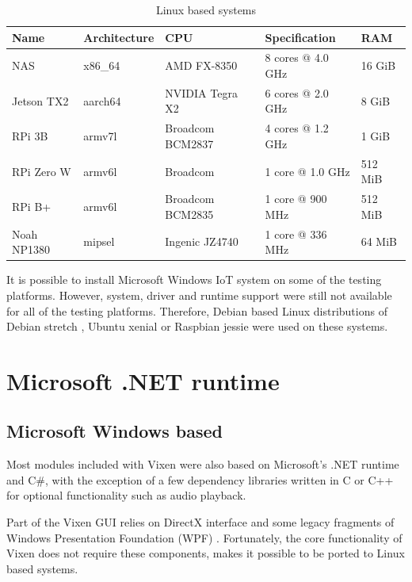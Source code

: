 \begin{table}[t]
  \centering
  \begin{tabular}{l|l|l|l|l}
    \hline
    \textbf{Name} & \textbf{Architecture} & \textbf{CPU} & \textbf{Specification} & \textbf{RAM} \\
    \hline
    NAS         & x86\_64 & AMD FX-8350       & 8 cores @ 4.0 GHz  & 16 GiB   \\ \hline
    Jetson TX2  & aarch64 & NVIDIA Tegra X2   & 6 cores @ 2.0 GHz  & 8 GiB    \\ \hline
    RPi 3B      & armv7l  & Broadcom BCM2837  & 4 cores @ 1.2 GHz  & 1 GiB    \\ \hline
    RPi Zero W  & armv6l  & Broadcom          & 1 core @ 1.0 GHz   & 512 MiB  \\ \hline
    RPi B+      & armv6l  & Broadcom BCM2835  & 1 core @ 900 MHz   & 512 MiB  \\ \hline
    Noah NP1380 & mipsel  & Ingenic JZ4740    & 1 core @ 336 MHz   & 64 MiB   \\ \hline
  \end{tabular}
  \caption{\footnotesize Linux based systems}
  \label{tbl:linux}
\end{table}

It is possible to install Microsoft Windows IoT system on some of the testing platforms. However, system, driver and runtime support were still not available for all of the testing platforms. Therefore, Debian \cite{debian} based Linux distributions of Debian stretch \cite{debian}, Ubuntu xenial \cite{ubuntu} or Raspbian jessie \cite{raspbian} were used on these systems.

\section{Microsoft .NET runtime}

\subsection{Microsoft Windows based}

Most modules included with Vixen were also based on Microsoft's .NET runtime and C\#, with the exception of a few dependency libraries written in C \cite{kernighan1988c} or C++ \cite{stroustrup1995c++} for optional functionality such as audio playback.

Part of the Vixen GUI relies on DirectX interface \cite{directx} and some legacy fragments of Windows Presentation Foundation (WPF) \cite{wpf}. Fortunately, the core functionality of Vixen does not require these components, makes it possible to be ported to Linux based systems.


